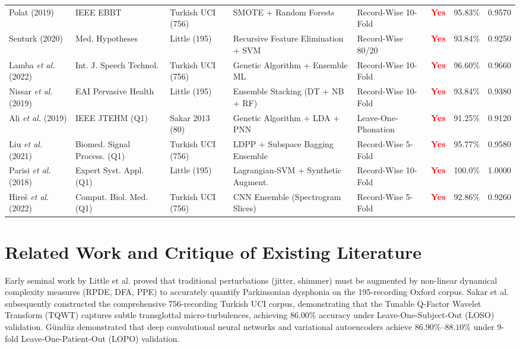 \documentclass[journal,10pt,twoside]{IEEEtran}
\begin{document}
\begin{table}[t]
\begin{tabular}{lp{3.2cm}lp{3.5cm}lccc}
Polat (2019) \cite{ref25} & IEEE EBBT & Turkish UCI (756) & SMOTE + Random Forests & Record-Wise 10-Fold & \textcolor{red}{\textbf{Yes}} & 95.83\% & 0.9570 \\
Senturk (2020) \cite{ref26} & Med. Hypotheses & Little (195) & Recursive Feature Elimination + SVM & Record-Wise 80/20 & \textcolor{red}{\textbf{Yes}} & 93.84\% & 0.9250 \\
Lamba \textit{et al.} (2022) \cite{ref27} & Int. J. Speech Technol. & Turkish UCI (756) & Genetic Algorithm + Ensemble ML & Record-Wise 10-Fold & \textcolor{red}{\textbf{Yes}} & 96.60\% & 0.9660 \\
Nissar \textit{et al.} (2019) \cite{ref28} & EAI Pervasive Health & Little (195) & Ensemble Stacking (DT + NB + RF) & Record-Wise 10-Fold & \textcolor{red}{\textbf{Yes}} & 93.84\% & 0.9380 \\
Ali \textit{et al.} (2019) \cite{ref29} & IEEE JTEHM (Q1) & Sakar 2013 (80) & Genetic Algorithm + LDA + PNN & Leave-One-Phonation & \textcolor{red}{\textbf{Yes}} & 91.25\% & 0.9120 \\
Liu \textit{et al.} (2021) \cite{ref30} & Biomed. Signal Process. (Q1) & Turkish UCI (756) & LDPP + Subspace Bagging Ensemble & Record-Wise 5-Fold & \textcolor{red}{\textbf{Yes}} & 95.77\% & 0.9580 \\
Parisi \textit{et al.} (2018) \cite{ref31} & Expert Syst. Appl. (Q1) & Little (195) & Lagrangian-SVM + Synthetic Augment. & Record-Wise 10-Fold & \textcolor{red}{\textbf{Yes}} & 100.0\% & 1.0000 \\
Hire\v{s} \textit{et al.} (2022) \cite{ref32} & Comput. Biol. Med. (Q1) & Turkish UCI (756) & CNN Ensemble (Spectrogram Slices) & Record-Wise 5-Fold & \textcolor{red}{\textbf{Yes}} & 92.86\% & 0.9260 \\
\bottomrule
\end{tabular}
\end{table}

\section{Related Work and Critique of Existing Literature}
Early seminal work by Little et al. \cite{ref3,ref4} proved that traditional perturbations (jitter, shimmer) must be augmented by non-linear dynamical complexity measures (RPDE, DFA, PPE) to accurately quantify Parkinsonian dysphonia on the 195-recording Oxford corpus. Sakar et al. \cite{ref1,ref2} subsequently constructed the comprehensive 756-recording Turkish UCI corpus, demonstrating that the Tunable Q-Factor Wavelet Transform (TQWT) captures subtle transglottal micro-turbulences, achieving $86.00\%$ accuracy under Leave-One-Subject-Out (LOSO) validation. G\"{u}nd\"{u}z \cite{ref20,ref21} demonstrated that deep convolutional neural networks and variational autoencoders achieve $86.90\%$--$88.10\%$ under 9-fold Leave-One-Patient-Out (LOPO) validation.
\end{document}

